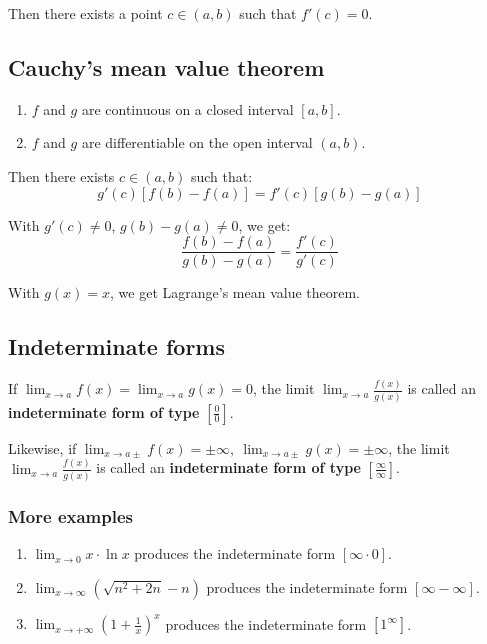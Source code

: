 \documentclass[11pt]{article}
\begin{document}
Then there exists a point \(c \in (a, b)\) such that \(f'(c) = 0\).

\newpage
\subsection{Cauchy's mean value theorem}
\label{sec:orgb660d9f}
\begin{enumerate}
\item \(f\) and \(g\) are continuous on a closed interval \([a, b]\).
\item \(f\) and \(g\) are differentiable on the open interval \((a, b)\).
\end{enumerate}

Then there exists \(c \in (a, b)\) such that:
\[g'(c)[f(b) - f(a)] = f'(c)[g(b) - g(a)]\]

With \(g'(c) \neq 0\), \(g(b) - g(a) \neq 0\), we get:
\[\frac{f(b) - f(a)}{g(b) - g(a)} = \frac{f'(c)}{g'(c)}\]

With \(g(x) = x\), we get Lagrange's mean value theorem.
\subsection{Indeterminate forms}
\label{sec:org34d19f0}
If \(\lim_{x \rightarrow a} f(x) = \lim_{x \rightarrow a}g(x) = 0\), the limit \(\lim_{x \rightarrow a} \frac{f(x)}{g(x)}\) is called an \textbf{indeterminate form of type} \(\left[\frac{0}{0} \right]\).


Likewise, if \(\lim_{x \rightarrow a \pm} f(x) = \pm \infty, \ \lim_{x \rightarrow a \pm} g(x) = \pm \infty\), the limit \(\lim_{x \rightarrow a} \frac{f(x)}{g(x)}\) is called an \textbf{indeterminate form of type} \(\left[ \frac{\infty}{\infty} \right]\).
\subsubsection{More examples}
\label{sec:org7ea4eae}
\begin{enumerate}
\item \(\lim_{x \rightarrow 0} x \cdot \ln x\) produces the indeterminate form \([\infty \cdot 0]\).
\item \(\lim_{x \rightarrow \infty} (\sqrt{n^2 + 2n} - n)\) produces the indeterminate form \([\infty - \infty]\).
\item \(\lim_{x \rightarrow +\infty} \left(1 + \frac{1}{x} \right)^x\) produces the indeterminate form \([1^{\infty}]\).
\end{enumerate}
\end{document}
